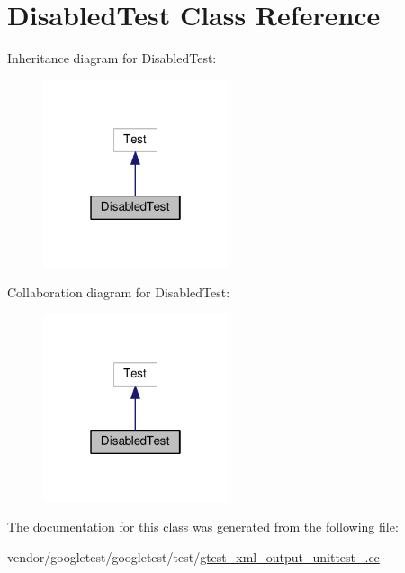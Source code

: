 \hypertarget{classDisabledTest}{}\section{Disabled\+Test Class Reference}
\label{classDisabledTest}


Inheritance diagram for Disabled\+Test\+:
\nopagebreak
\begin{figure}[H]
\begin{center}
\leavevmode
\includegraphics[width=154pt]{classDisabledTest__inherit__graph}
\end{center}
\end{figure}


Collaboration diagram for Disabled\+Test\+:
\nopagebreak
\begin{figure}[H]
\begin{center}
\leavevmode
\includegraphics[width=154pt]{classDisabledTest__coll__graph}
\end{center}
\end{figure}


The documentation for this class was generated from the following file\+:\begin{DoxyCompactItemize}
\item 
vendor/googletest/googletest/test/\hyperlink{gtest__xml__output__unittest___8cc}{gtest\+\_\+xml\+\_\+output\+\_\+unittest\+\_\+.\+cc}\end{DoxyCompactItemize}

